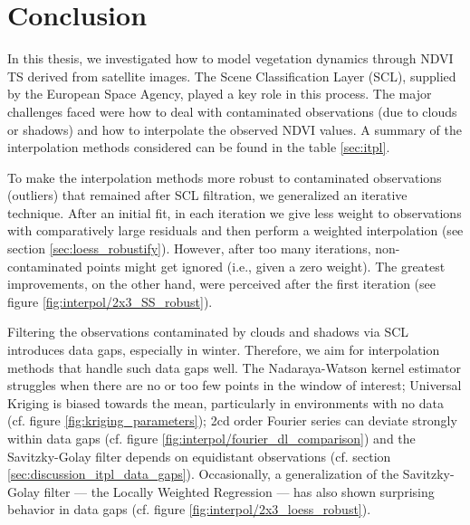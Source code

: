 \chapter{Conclusion}
\label{sec:Conclusion}


    In this thesis, we investigated how to model vegetation dynamics through NDVI {TS} derived from satellite images. The Scene Classification Layer (SCL), supplied by the European Space Agency, played a key role in this process. The major challenges faced were how to deal with contaminated observations (due to clouds or shadows) and how to interpolate the observed NDVI values. 
    A summary of the interpolation methods considered can be found in the table \ref{sec:itpl}. 
    
    To make the interpolation methods more robust to contaminated observations (outliers) that remained after SCL filtration, we generalized an iterative technique. After an initial fit, in each iteration we give less weight to observations with comparatively large residuals and then perform a weighted interpolation (see section \ref{sec:loess_robustify}). However, after too many iterations, non-contaminated points might get ignored (i.e., given a zero weight). The greatest improvements, on the other hand, were perceived after the first iteration (see figure \ref{fig:interpol/2x3_SS_robust}). 
    
    Filtering the observations contaminated by clouds and shadows via SCL introduces data gaps, especially in winter. Therefore, we aim for interpolation methods that handle such data gaps well. The Nadaraya-Watson kernel estimator struggles when there are no or too few points in the window of interest; Universal Kriging is biased towards the mean, particularly in environments with no data (cf. figure \ref{fig:kriging_parameters}); 2cd order Fourier series can deviate strongly within data gaps (cf. figure \ref{fig:interpol/fourier_dl_comparison}) and the Savitzky-Golay filter depends on equidistant observations (cf. section \ref{sec:discussion_itpl_data_gaps}). Occasionally, a generalization of the Savitzky-Golay filter --- the Locally Weighted Regression --- has also shown surprising behavior in data gaps (cf. figure \ref{fig:interpol/2x3_loess_robust}).
    
